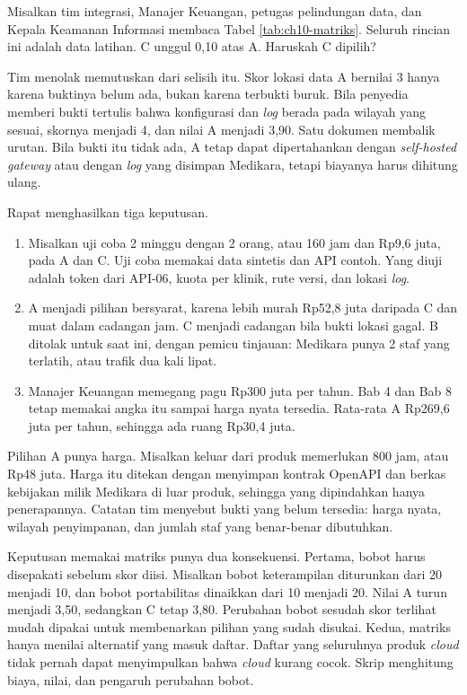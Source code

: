 \begin{kasus}[title={Kasus Medikara Health: Memilih dari Selisih 0,10}]
Misalkan tim integrasi, Manajer Keuangan, petugas pelindungan data, dan Kepala Keamanan Informasi membaca Tabel
\ref{tab:ch10-matriks}. Seluruh rincian ini adalah data latihan. C unggul 0,10 atas A. Haruskah C dipilih?

Tim menolak memutuskan dari selisih itu. Skor lokasi data A bernilai 3 hanya karena buktinya belum ada, bukan karena
terbukti buruk. Bila penyedia memberi bukti tertulis bahwa konfigurasi dan \textit{log} berada pada wilayah yang sesuai,
skornya menjadi 4, dan nilai A menjadi 3,90. Satu dokumen membalik urutan. Bila bukti itu tidak ada, A tetap dapat
dipertahankan dengan \textit{self-hosted gateway} atau dengan \textit{log} yang disimpan Medikara, tetapi biayanya harus
dihitung ulang.

Rapat menghasilkan tiga keputusan.
\begin{enumerate}
  \item Misalkan uji coba 2 minggu dengan 2 orang, atau 160 jam dan Rp9,6 juta, pada A dan C. Uji coba memakai data
        sintetis dan API contoh. Yang diuji adalah token dari API-06, kuota per klinik, rute versi, dan lokasi
        \textit{log}.
  \item A menjadi pilihan bersyarat, karena lebih murah Rp52,8 juta daripada C dan muat dalam cadangan jam. C menjadi
        cadangan bila bukti lokasi gagal. B ditolak untuk saat ini, dengan pemicu tinjauan: Medikara punya 2 staf yang
        terlatih, atau trafik dua kali lipat.
  \item Manajer Keuangan memegang pagu Rp300 juta per tahun. Bab 4 dan Bab 8 tetap memakai angka itu sampai harga nyata
        tersedia. Rata-rata A Rp269,6 juta per tahun, sehingga ada ruang Rp30,4 juta.
\end{enumerate}

Pilihan A punya harga. Misalkan keluar dari produk memerlukan 800 jam, atau Rp48 juta. Harga itu ditekan dengan
menyimpan kontrak OpenAPI dan berkas kebijakan milik Medikara di luar produk, sehingga yang dipindahkan hanya
penerapannya. Catatan tim menyebut bukti yang belum tersedia: harga nyata, wilayah penyimpanan, dan jumlah staf yang
benar-benar dibutuhkan.
\end{kasus}

Keputusan memakai matriks punya dua konsekuensi. Pertama, bobot harus disepakati sebelum skor diisi. Misalkan bobot
keterampilan diturunkan dari 20 menjadi 10, dan bobot portabilitas dinaikkan dari 10 menjadi 20. Nilai A turun menjadi
3,50, sedangkan C tetap 3,80. Perubahan bobot sesudah skor terlihat mudah dipakai untuk membenarkan pilihan yang sudah
disukai. Kedua, matriks hanya menilai alternatif yang masuk daftar. Daftar yang seluruhnya produk \textit{cloud} tidak
pernah dapat menyimpulkan bahwa \textit{cloud} kurang cocok. Skrip 
menghitung biaya, nilai, dan pengaruh perubahan bobot.

